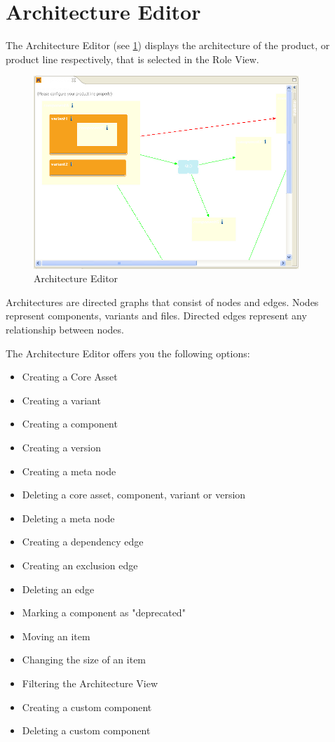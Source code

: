 \section{Architecture Editor}

The Architecture Editor (see \ref{architecture}) displays the architecture of the product,
or product line respectively, that is selected in the Role View. \par

\begin{figure}[h!]
\begin{center}
\includegraphics[width=10cm]{architecture.png}
   \caption{Architecture Editor}
\label{architecture}
\end{center}
\end{figure}\par

Architectures are directed graphs that consist of nodes and edges. 
Nodes represent components, variants and files. Directed edges represent
any relationship between nodes.\par

The Architecture Editor offers you the following options:
\begin{itemize}
	\item Creating a Core Asset
	\item Creating a variant
	\item Creating a component
	\item Creating a version
	\item Creating a meta node
	\item Deleting a core asset, component, variant or version
	\item Deleting a meta node
	\item Creating a dependency edge
	\item Creating an exclusion edge
	\item Deleting an edge
	\item Marking a component as "deprecated"
	\item Moving an item
	\item Changing the size of an item
	\item Filtering the Architecture View
	\item Creating a custom component
	\item Deleting a custom component
\end{itemize}

